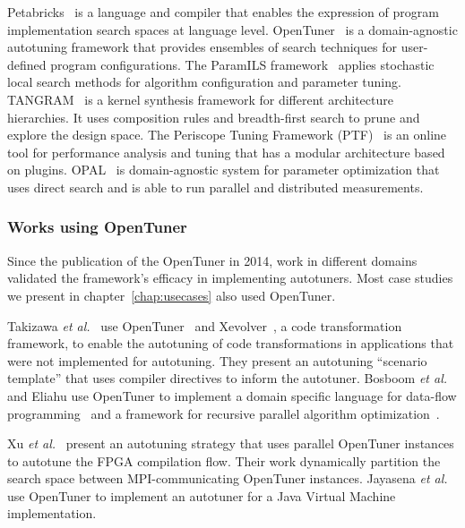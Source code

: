 Petabricks~\cite{ansel2009petabricks} is a language and compiler that enables
the expression of program implementation search spaces at language level.
OpenTuner~\cite{ansel2014opentuner} is a domain-agnostic autotuning framework
that provides ensembles of search techniques for user-defined program
configurations.  The ParamILS framework~\cite{hutter2009paramils} applies
stochastic local search methods for algorithm configuration and parameter
tuning.  TANGRAM~\cite{chang2015tangram,chang2016efficient} is a kernel
synthesis framework for different architecture hierarchies.  It uses
composition rules and breadth-first search to prune and explore the design
space.  The Periscope Tuning Framework
(PTF)~\cite{gerndt2005periscope,gerndt2010automatic,gerndt2017multi} is an
online tool for performance analysis and tuning that has a modular architecture
based on plugins.  OPAL~\cite{audet2014optimization} is domain-agnostic system
for parameter optimization that uses direct search and is able to run parallel
and distributed measurements.

\subsubsection{Works using OpenTuner}

Since the publication of the OpenTuner in 2014, work in different domains
validated the framework's efficacy in implementing autotuners. Most case
studies we present in chapter~\ref{chap:usecases} also used OpenTuner.

Takizawa \emph{et al.}~\cite{takizawa2017customizable} use
OpenTuner~\cite{ansel2014opentuner} and Xevolver~\cite{takizawa2014xevolver}, a
code transformation framework, to enable the autotuning of code transformations
in applications that were not implemented for autotuning. They present an
autotuning ``scenario template'' that uses compiler directives to inform the
autotuner.  Bosboom \emph{et al.} and Eliahu use OpenTuner to implement a
domain specific language for data-flow programming~\cite{bosboom2014streamjit}
and a framework for recursive parallel algorithm
optimization~\cite{eliahu2015frpa}.

Xu \emph{et al.}~\cite{xu2017parallel} present an autotuning strategy that uses
parallel OpenTuner instances to autotune the FPGA compilation flow.  Their work
dynamically partition the search space between MPI-communicating OpenTuner
instances.  Jayasena \emph{et al.}~\cite{jayasena2015auto} use OpenTuner to
implement an autotuner for a Java Virtual Machine implementation.

